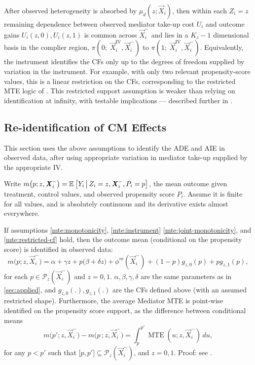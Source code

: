 After observed heterogeneity is absorbed by $\mu_d(z;\vec X_i)$, then within each $Z_i = z$ remaining dependence between observed mediator take-up cost $U_i$ and outcome gains $U_i(z,0), U_i(z,1)$ is common across $\vec X_i^-$ and lies in a $K_z-1$ dimensional basis in the complier region, $\pi(0;\; \vec X_i^{\mathrm{IV}}, \vec X_i^-)$ to $\pi(1; \;\vec X_i^{\mathrm{IV}}, \vec X_i^-)$.
Equivalently, the instrument identifies the CFs only up to the degrees of freedom supplied by variation in the instrument.
For example, with only two relevant propensity-score values, this is a linear restriction on the CFs, corresponding to the restricted MTE logic of \cite{brinch2017beyond}.
This restricted support assumption is weaker than relying on identification at infinity, with testable implications --- described further in .

\subsection{Re-identification of CM Effects}
This section uses the above assumptions to identify the ADE and AIE in observed data, after using appropriate variation in mediator take-up supplied by the appropriate IV.

Write $m\big(p; z, \boldsymbol{\mathit{X}}_i^-\big) = \mathbb{E}_{} \left[ Y_i \, \middle\vert \, Z_i = z, \boldsymbol{\mathit{X}}_i^-, P_i = p \right]$, the mean outcome given treatment, control values, and observed propensity score $P_i$.
Assume it is finite for all values, and is absolutely continuous and its derivative exists almost everywhere.
\begin{proposition}
    \label{proposition:secondstage}
    If assumptions \ref{mte:monotonicity}, \ref{mte:instrument} \ref{mte:joint-monotonicity}, and \ref{mte:restricted-cf} hold, then the outcome mean (conditional on the propensity score) is identified in observed data:
    \[ m\big(p; z, \vec X_i^-\big)
    = \alpha + \gamma z + p \big(\beta + \delta z)
    + \phi^m(\vec X_i^-)
    + (1-p) g_{z,0}(p)
    + p g_{z,1}(p), \]
    for each $p \in \mathcal P_{z} \left(\vec X_i^- \right)$ and $z=0,1$.
    $\alpha, \beta, \gamma, \delta$ are the same parameters as in \autoref{sec:applied}, and $g_{z,0}(.), g_{z,1}(.)$ are the CFs defined above (with an assumed restricted shape).
    Furthermore, the average Mediator MTE is point-wise identified on the propensity score support, as the difference between conditional means
    \[ m\big(p'; z, \vec X_i^-\big) - m\big(p\,; z, \vec X_i^-\big)
    = \int_p^{p'} \operatorname{MTE}(u; z, \vec X_i^-) \,du, \]
    for any $p<p'$ such that
    $\big[ p,p' \big] \subseteq \mathcal P_z(\vec X_i^-)$, and $z = 0,1$.
    Proof: see .
\end{proposition}

